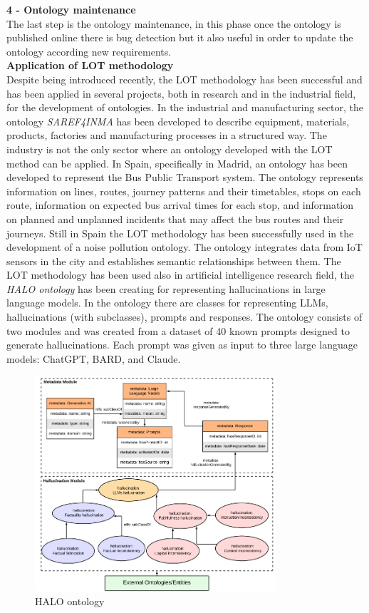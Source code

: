 \textbf{4 - Ontology maintenance}\\
The last step is the ontology maintenance, in this phase once the ontology is published online there is bug detection but it also useful in order to update the ontology according new requirements.\\

\textbf{Application of LOT methodology}\\
Despite being introduced recently, the LOT methodology has been successful and has been applied in several projects, both in research and in the industrial field, for the development of ontologies. In the industrial and manufacturing sector, the ontology \textit{SAREF4INMA} \cite{de2020saref4inma} has been developed to describe equipment, materials, products, factories and manufacturing processes in a structured way. The industry is not the only sector where an ontology developed with the LOT method can be applied. In Spain, specifically in Madrid, an ontology has been developed to represent the Bus Public Transport system. \cite{ruckhaus2023applying} The ontology represents information on lines, routes, journey patterns and their timetables, stops on each route, information on expected bus arrival times for each stop, and information on planned and unplanned incidents that may affect the bus routes and their journeys. Still in Spain the LOT methodology has been successfully used in the development of a noise pollution ontology.\cite{espinoza2020using} The ontology integrates data from IoT sensors in the city and establishes semantic relationships between them. The LOT methodology has been used also in artificial intelligence research field, the \textit{HALO ontology} \cite{nananukul2024halo} has been creating for representing hallucinations in large language models. In the ontology there are classes for representing LLMs, hallucinations (with subclasses), prompts and responses. The ontology consists of two modules and was created from a dataset of 40 known prompts designed to generate hallucinations. Each prompt was given as input to three large language models: ChatGPT, BARD, and Claude.
\begin{figure}[H]
    \centering
    \includegraphics[width=0.7\linewidth, height=8cm]{Figures/fig_4.png}
    \caption{HALO ontology}
    \label{fig:enter-label}
\end{figure}
